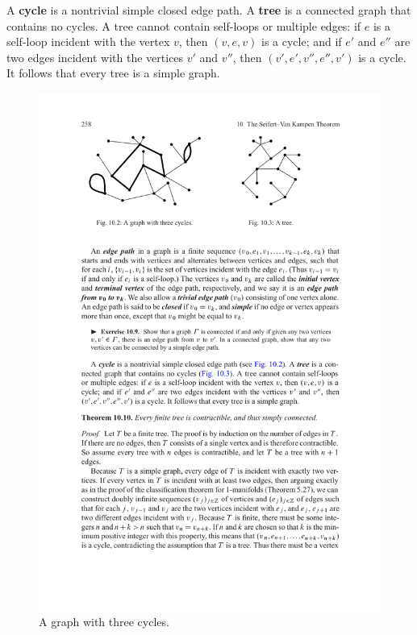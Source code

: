 A \textbf{cycle} is a nontrivial simple closed edge path. A \textbf{tree} is a connected graph that contains no cycles. A tree cannot contain self-loops or multiple edges: if $e$ is a self-loop incident with the vertex $v$, then $(v,e,v)$ is a cycle; and if $e'$ and $e''$ are two edges incident with the vertices $v'$ and $v''$, then $(v',e',v'',e'',v')$ is a cycle. It follows that every tree is a simple graph.
\begin{figure}[htpb]
\centering
\begin{minipage}{200pt}
\centering
\includegraphics{pictures/Graph-eg1}
\caption{A graph with three cycles.}
\end{minipage}
\hspace{20pt}
\begin{minipage}{200pt}

\end{minipage}
\end{figure}
